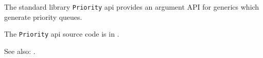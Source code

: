 
The standard library {\tt Priority} api provides an argument API for generics which generate 
priority queues.

The {\tt Priority} api source code is in .

See also:  .
